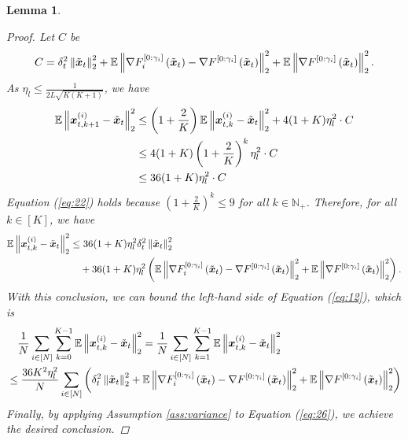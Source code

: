 \documentclass{article}
\theoremstyle{plain}
\newtheorem{lemma}[theorem]{Lemma}
\theoremstyle{definition}
\theoremstyle{remark}
\newcommand{\E}{\mathbb{E}}
\renewcommand{\eqref}[1]{Equation (\ref{#1})}
\newcommand{\bracket}[1]{\left(#1\right)}
\newcommand{\norm}[1]{\left\|#1\right\|_2^2}
\newcommand{\outergradgamma}[2]{\nabla F_{#1}^{[0: \gamma_{#1}]}\bracket{\x{#2}}}
\newcommand{\globaloutergradgamma}[2]{\nabla F^{[0: \gamma_{#1}]}\bracket{\x{#2}}}
\begin{document}
\begin{lemma}
\begin{proof}
Let $C$ be
\begin{align}
    C = \delta_t^2 \norm{\x{t}} + \E \norm{\outergradgamma{i}{t} - \globaloutergradgamma{i}{t}} + \E\norm{\globaloutergradgamma{i}{t}}. 
\end{align}
As $\eta_l \leq \frac{1}{2L\sqrt{K(K+1)}}$, we have 
\begin{align} 
\E \norm{\x{i}{t}{k+1} - \x{t}} &\leq \bracket{1 + \frac{2}{K}} \E\norm{\x{i}{t}{k} - \x{t}} + 4(1+K) \eta_l^2 \cdot C \\
&\leq 4(1+K) \bracket{1 + \frac{2}{K}}^k \eta_l^2 \cdot C \\
&\leq 36(1+K) \eta_l^2 \cdot C \label{eq:22}
\end{align}
\eqref{eq:22} holds because $\bracket{1 + \frac{2}{K}}^k \leq 9$ for all $k \in \mathbb{N}_{+}$. Therefore, for all $k \in [K]$, we have
\begin{align}
\E \norm{\x{i}{t}{k} - \x{t}} &\leq 36(1+K) \eta_l^2 \delta_t^2 \norm{\x{t}} \\
&\quad + 36(1+K) \eta_l^2 \bracket{ \E \norm{\outergradgamma{i}{t} - \globaloutergradgamma{i}{t}} + \E\norm{\globaloutergradgamma{i}{t}}}.
\end{align}
With this  conclusion, we can bound the left-hand side of \eqref{eq:12}, which is 
\begin{align}
&\quad \frac{1}{N} \sum_{i \in [N]} \sum_{k=0}^{K-1} \E\norm{\x{i}{t}{k} - \x{t}} = \frac{1}{N} \sum_{i \in [N]} \sum_{k=1}^{K-1} \E\norm{\x{i}{t}{k} - \x{t}} \\
&\leq \frac{36 K^2 \eta_l^2}{N} \sum_{i \in [N]} \bracket{\delta_t^2 \norm{\x{t}} + \E \norm{\outergradgamma{i}{t} - \globaloutergradgamma{i}{t}} + \E\norm{\globaloutergradgamma{i}{t}}} \label{eq:26}
\end{align}
Finally, by applying Assumption \ref{ass:variance} to \eqref{eq:26}, we achieve the desired conclusion. 
\end{proof}
\end{lemma}
\end{document}
